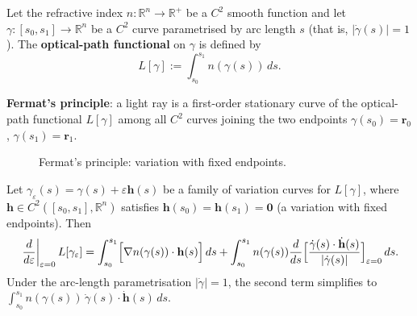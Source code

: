 \begin{definition}\label{def:optical_path_functional}
Let the refractive index $n:\mathbb{R}^n\to\mathbb{R}^+$ be a $C^2$ smooth function and let $\gamma:[s_0,s_1]\to\mathbb{R}^n$ be a $C^2$ curve parametrised by arc length $s$ (that is, $|\dot\gamma(s)|=1$). The \textbf{optical-path functional} on $\gamma$ is defined by
\[
L[\gamma] := \int_{s_0}^{s_1} n(\gamma(s))\,ds.
\]
\end{definition}

\begin{definition}\label{def:fermat_principle}
\textbf{Fermat's principle}: a light ray is a first-order stationary curve of the optical-path functional $L[\gamma]$ among all $C^2$ curves joining the two endpoints $\gamma(s_0)=\mathbf{r}_0$, $\gamma(s_1)=\mathbf{r}_1$.
\end{definition}

\begin{figure}[htbp]
\centering
{}
\caption{Fermat's principle: variation with fixed endpoints.}
\label{fig:fermat_variation}
\end{figure}

\begin{lemma}\label{lem:optical_path_variation}
Let $\gamma_\varepsilon(s) = \gamma(s) + \varepsilon\mathbf{h}(s)$ be a family of variation curves for $L[\gamma]$, where $\mathbf{h}\in C^2([s_0,s_1],\mathbb{R}^n)$ satisfies $\mathbf{h}(s_0)=\mathbf{h}(s_1)=\mathbf{0}$ (a variation with fixed endpoints). Then
\[
\left.\frac{d}{d\varepsilon}\right|_{\varepsilon=0} L[\gamma_\varepsilon]
= \int_{s_0}^{s_1}\Bigl[\nabla n(\gamma(s))\cdot\mathbf{h}(s)\Bigr]\,ds
+ \int_{s_0}^{s_1}n(\gamma(s))\frac{d}{ds}\Bigl[\frac{\dot\gamma(s)\cdot\dot{\mathbf{h}}(s)}{|\dot\gamma(s)|}\Bigr]_{\varepsilon=0}\,ds.
\]
Under the arc-length parametrisation $|\dot\gamma|=1$, the second term simplifies to $\int_{s_0}^{s_1}n(\gamma(s))\,\dot\gamma(s)\cdot\dot{\mathbf{h}}(s)\,ds$.
\end{lemma}

